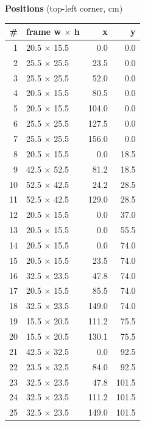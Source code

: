 \documentclass[a4paper,landscape,10pt]{article}
\begin{document}
\begin{minipage}[t]{0.25\textwidth}
\vspace{8pt}
{\bfseries Positions} (top-left corner, cm)\\[2pt]
\tiny
\begin{tabular}{@{}r l r r@{}}
\toprule
\# & frame w $\times$ h & x & y \\
\midrule
1 & 20.5 $\times$ 15.5 & 0.0 & 0.0 \\
2 & 25.5 $\times$ 25.5 & 23.5 & 0.0 \\
3 & 25.5 $\times$ 25.5 & 52.0 & 0.0 \\
4 & 20.5 $\times$ 15.5 & 80.5 & 0.0 \\
5 & 20.5 $\times$ 15.5 & 104.0 & 0.0 \\
6 & 25.5 $\times$ 25.5 & 127.5 & 0.0 \\
7 & 25.5 $\times$ 25.5 & 156.0 & 0.0 \\
8 & 20.5 $\times$ 15.5 & 0.0 & 18.5 \\
9 & 42.5 $\times$ 52.5 & 81.2 & 18.5 \\
10 & 52.5 $\times$ 42.5 & 24.2 & 28.5 \\
11 & 52.5 $\times$ 42.5 & 129.0 & 28.5 \\
12 & 20.5 $\times$ 15.5 & 0.0 & 37.0 \\
13 & 20.5 $\times$ 15.5 & 0.0 & 55.5 \\
14 & 20.5 $\times$ 15.5 & 0.0 & 74.0 \\
15 & 20.5 $\times$ 15.5 & 23.5 & 74.0 \\
16 & 32.5 $\times$ 23.5 & 47.8 & 74.0 \\
17 & 20.5 $\times$ 15.5 & 85.5 & 74.0 \\
18 & 32.5 $\times$ 23.5 & 149.0 & 74.0 \\
19 & 15.5 $\times$ 20.5 & 111.2 & 75.5 \\
20 & 15.5 $\times$ 20.5 & 130.1 & 75.5 \\
21 & 42.5 $\times$ 32.5 & 0.0 & 92.5 \\
22 & 23.5 $\times$ 32.5 & 84.0 & 92.5 \\
23 & 32.5 $\times$ 23.5 & 47.8 & 101.5 \\
24 & 32.5 $\times$ 23.5 & 111.2 & 101.5 \\
25 & 32.5 $\times$ 23.5 & 149.0 & 101.5 \\
\bottomrule
\end{tabular}
\end{minipage}
\clearpage
\end{document}
